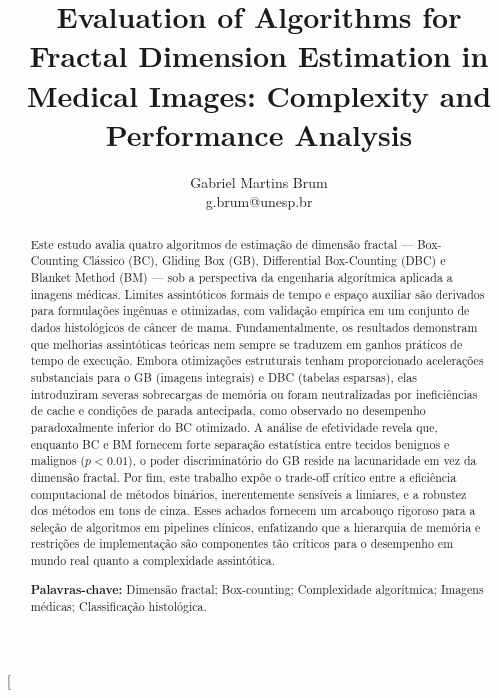 \documentclass[10pt,a4paper,twocolumn]{article}
\title{Evaluation of Algorithms for Fractal Dimension Estimation in Medical Images: Complexity and Performance Analysis}
\author{
Gabriel Martins Brum%
\\
\normalsize g.brum@unesp.br\\
}
\date{}
\begin{document}
\twocolumn[
\maketitle

\begin{@twocolumnfalse}
\begin{abstract}
\noindent Este estudo avalia quatro algoritmos de estimação de dimensão fractal — Box-Counting Clássico (BC), Gliding Box (GB), Differential Box-Counting (DBC) e Blanket Method (BM) — sob a perspectiva da engenharia algorítmica aplicada a imagens médicas. Limites assintóticos formais de tempo e espaço auxiliar são derivados para formulações ingênuas e otimizadas, com validação empírica em um conjunto de dados histológicos de câncer de mama. Fundamentalmente, os resultados demonstram que melhorias assintóticas teóricas nem sempre se traduzem em ganhos práticos de tempo de execução. Embora otimizações estruturais tenham proporcionado acelerações substanciais para o GB (imagens integrais) e DBC (tabelas esparsas), elas introduziram severas sobrecargas de memória ou foram neutralizadas por ineficiências de cache e condições de parada antecipada, como observado no desempenho paradoxalmente inferior do BC otimizado. A análise de efetividade revela que, enquanto BC e BM fornecem forte separação estatística entre tecidos benignos e malignos ($p < 0.01$), o poder discriminatório do GB reside na lacunaridade em vez da dimensão fractal. Por fim, este trabalho expõe o trade-off crítico entre a eficiência computacional de métodos binários, inerentemente sensíveis a limiares, e a robustez dos métodos em tons de cinza. Esses achados fornecem um arcabouço rigoroso para a seleção de algoritmos em pipelines clínicos, enfatizando que a hierarquia de memória e restrições de implementação são componentes tão críticos para o desempenho em mundo real quanto a complexidade assintótica.

\vspace{0.3em}
\noindent \textbf{Palavras-chave:} Dimensão fractal; Box-counting; Complexidade algorítmica; Imagens médicas; Classificação histológica.
\end{abstract}


\end{@twocolumnfalse}
\end{document}
